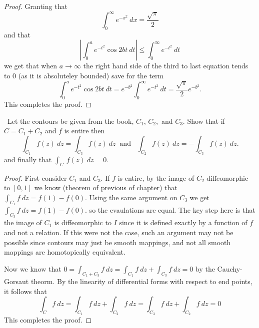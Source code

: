 \documentclass[11pt]{amsart}
\theoremstyle{definition}
\numberwithin{theorem}{section}
\numberwithin{definition}{section}
\numberwithin{equation}{section}
\begin{document}
\begin{proof}
	Granting that
	\begin{equation*}
		\int_0^\infty e^{-x^2}\ dx = \frac{\sqrt{\pi}}{2}
	\end{equation*}
	and that 
	\begin{equation*}
	\left|\int_{0}^a e^{-t^2}\cos{2bt}\ dt\right| \leq \int_0^\infty e^{-t^2}\ dt 
	\end{equation*}
	we get that when $a \to \infty$ the right hand side of the third to last equation tends to $0$ (as it is absoluteley bounded) save for the term 
	\begin{equation*}
	\int_{0}^a e^{-t^2}\cos{2bt}\ dt = e^{-b^2}\int_{0}^\infty e^{-t^2}\ dt = \frac{\sqrt{\pi}}{2}e^{-b^2}.
	\end{equation*}
	This completes the proof.

\end{proof}

\medskip {}\ Let the contours be given from the book, $C_1$, $C_2,$ and $C_3$. Show that if $C = C_1 + C_2$
and $f$ is entire then
\begin{equation*}
	\int_{C_1} f(z)\ dz = \int_{C_3} f(z)\ dz\;\;\text{and}\;\;\;\int_{C_2} f(z)\ dz = - \int_{C_3} f(z)\ dz.
\end{equation*}
and finally that $\int_C\ f(z)\ dz = 0$.
\begin{proof}
	First consider $C_1$ and $C_3$. If $f$ is entire, by the image of $C_2$ diffeomorphic to $[0,1]$ we know (theorem of previous of chapter) that $\int_{C_1} f\ dz = f(1) - f(0).$ Using the same argument on $C_3$ we get $ \int_{C_3} f\ dz = f(1) - f(0).$ so the evaulations are equal. The key step here is that the image of $C_1$ is diffeomorphic to $I$ since it is defined exactly by a function of $f$ and not a relation. If this were not the case, such an argument may not be possible since contours may just be smooth mappings, and not all smooth mappings are homotopically equivalent. 

	Now we know that $0 = \int_{C_1+C_3} f\ dz = \int_{C_1} f\ dz + \int_{C_3} f\ dz = 0$ by the Cauchy-Gorsaut theorm. By the linearity of differential forms with respect to end points, it follows that
	\begin{equation*}
		\int_C f\ dz = \int_{C_1} f\ dz + \int_{C_2} f\ dz =\int_{C_3} f\ dz + \int_{C_2} f\ dz = 0
	\end{equation*}
	This completes the proof.
\end{proof}
\end{document}
